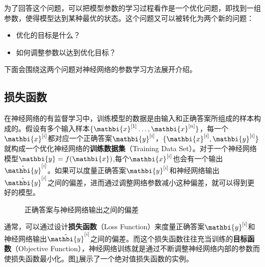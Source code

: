 \parinterval 为了回答这个问题，可以把模型参数的学习过程看作是一个优化问题，即找到一组参数，使得模型达到某种最优的状态。这个问题又可以被转化为两个新的问题：

\begin{itemize}
\vspace{0.5em}
\item 优化的目标是什么？
\vspace{0.5em}
\item 如何调整参数以达到优化目标？
\vspace{0.5em}
\end{itemize}

\parinterval 下面会围绕这两个问题对神经网络的参数学习方法展开介绍。


\subsection{损失函数}

\parinterval 在神经网络的有监督学习中，训练模型的数据是由输入和正确答案所组成的样本构成的。假设有多个输入样本$ \{{\mathbi{x}}^{[1]}\dots,{\mathbi{x}}^{[n]}\} $，每一个$ {\mathbi{x}}^{[i]}$都对应一个正确答案$ {\mathbi{y}}^{[i]} $，$ \{{\mathbi{x}}^{[i]},{\mathbi{y}}^{[i]}\} $就构成一个优化神经网络的{\small\sffamily\bfseries{训练数据集}}（Training Data Set）。对于一个神经网络模型${\mathbi{y}}=f({\mathbi{x}}) $,每个$ {\mathbi{x}}^{[i]} $也会有一个输出$ {\hat{\mathbi{y}}}^{[i]} $。如果可以度量正确答案$ {\mathbi{y}}^{[i]} $和神经网络输出$ {\hat{\mathbi{y}}}^{[i]} $之间的偏差，进而通过调整网络参数减小这种偏差，就可以得到更好的模型。

\begin{figure}[htp]
\centering

\caption{正确答案与神经网络输出之间的偏差}
\label{fig:9-42}
\end{figure}

\parinterval 通常，可以通过设计{\small\sffamily\bfseries{损失函数}}（Loss Function）来度量正确答案$ {\mathbi{y}}^{[i]} $和神经网络输出$ {\hat{\mathbi{y}}}^{[i]} $之间的偏差。而这个损失函数往往充当训练的{\small\sffamily\bfseries{目标函数}}（Objective Function），神经网络训练就是通过不断调整神经网络内部的参数而使损失函数最小化。图\ref{fig:9-42}展示了一个绝对值损失函数的实例。

